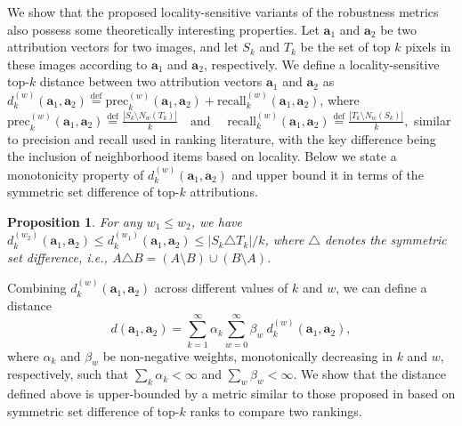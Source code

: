 \documentclass[letterpaper]{article} %
\newtheorem{prop}{Proposition}
\def\ba{\mathbf{a}}
\newcommand{\size}[1]{\left|#1\right|}
\begin{document}
We show that the proposed locality-sensitive variants of the robustness metrics also possess some theoretically interesting properties. Let $\ba_{1}$ and $\ba_{2}$ be two attribution vectors for two images, and let $S_{k}$ and $T_{k}$ be the set of top $k$ pixels in these images according to $\ba_{1}$ and $\ba_{2}$, respectively. We define a locality-sensitive top-$k$ distance between two attribution vectors $\ba_{1}$ and $\ba_{2}$ as $d_{k}^{(w)}(\ba_{1}, \ba_{2})\overset{\text{def}}{=} \text{prec}_{k}^{(w)}(\ba_{1}, \ba_{2}) + \text{recall}_{k}^{(w)}(\ba_{1}, \ba_{2})$, where
$
\text{prec}_{k}^{(w)}(\ba_{1}, \ba_{2}) \overset{\text{def}}{=} \frac{\size{S_{k} \setminus N_{w}(T_{k})}}{k} \quad \text{and} 
$
$
\quad \text{recall}_{k}^{(w)}(\ba_{1}, \ba_{2}) \overset{\text{def}}{=} \frac{\size{T_{k} \setminus N_{w}(S_{k})}}{k},
$
similar to precision and recall used in ranking literature, with the key difference being the inclusion of neighborhood items based on locality. Below we state a monotonicity property of $d_{k}^{(w)}(\ba_{1}, \ba_{2})$ and upper bound it in terms of the symmetric set difference of top-$k$ attributions. 
\begin{prop} \label{prop:monotone}
For any $w_{1} \leq w_{2}$, we have $d_{k}^{(w_{2})}(\ba_{1}, \ba_{2}) \leq d_{k}^{(w_{1})}(\ba_{1}, \ba_{2}) \leq \size{S_{k} \triangle T_{k}}/k$, where $\triangle$ denotes the symmetric set difference, i.e., $A \triangle B = (A \setminus B) \cup (B \setminus A)$.
\end{prop}
Combining $d_{k}^{(w)}(\ba_{1}, \ba_{2})$ across different values of $k$ and $w$, we can define a distance 
\[
d(\ba_{1}, \ba_{2}) = \sum_{k=1}^{\infty} \alpha_{k} \sum_{w=0}^{\infty} \beta_{w}~ d_{k}^{(w)}(\ba_{1}, \ba_{2}),
\] 
where $\alpha_{k}$ and $\beta_{w}$ be non-negative weights, monotonically decreasing in $k$ and $w$, respectively, such that $\sum_{k} \alpha_{k} < \infty$ and $\sum_{w} \beta_{w} < \infty$. We show that the distance defined above is upper-bounded by a metric similar to those proposed in \cite{fagin2003comparing} based on symmetric set difference of top-$k$ ranks to compare two rankings.
\end{document}
